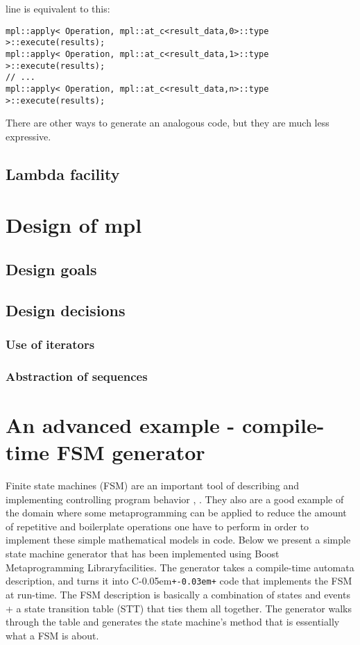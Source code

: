 \documentclass{kapproc}
\newcommand{\Cpp}{C\kern-0.05em\texttt{+\kern-0.03em+}%
}
\newcommand{\Mpl}{Boost Meta\-pro\-gram\-ming Library}
\newcommand{\mping}{meta\-pro\-gram\-ming}
\begin{document}
line is equivalent to this:

{\small
\begin{codesamp}\begin{verbatim}
mpl::apply< Operation, mpl::at_c<result_data,0>::type >::execute(results);
mpl::apply< Operation, mpl::at_c<result_data,1>::type >::execute(results);
// ...
mpl::apply< Operation, mpl::at_c<result_data,n>::type >::execute(results);
\end{verbatim}
\end{codesamp}
}

There are other ways to generate an analogous code, 
but they are much less expressive.


\subsection{Lambda facility}

\section{Design of mpl}
\subsection{Design goals}
\subsection{Design decisions}
\subsubsection{Use of iterators}
\subsubsection{Abstraction of sequences}

\section{An advanced example - compile-time FSM generator}


Finite state machines (FSM) are an important tool of 
describing and implementing controlling program behavior 
\cite{HU79}, \cite{Mar98}. They also are a good example of the domain 
where some \mping{} can be applied to reduce the amount of 
repetitive and boilerplate operations one have to perform 
in order to implement these simple mathematical models in 
code. Below we present a simple state machine generator that 
has been implemented using \Mpl facilities. The generator 
takes a compile-time automata description, and turns it 
into \Cpp code that implements the FSM at run-time. The 
FSM description is basically a combination of states and 
events + a state transition table (STT) that ties them 
all together. The generator walks through the table and 
generates the state machine's  
method that is essentially what a FSM is about. 
\end{document}
